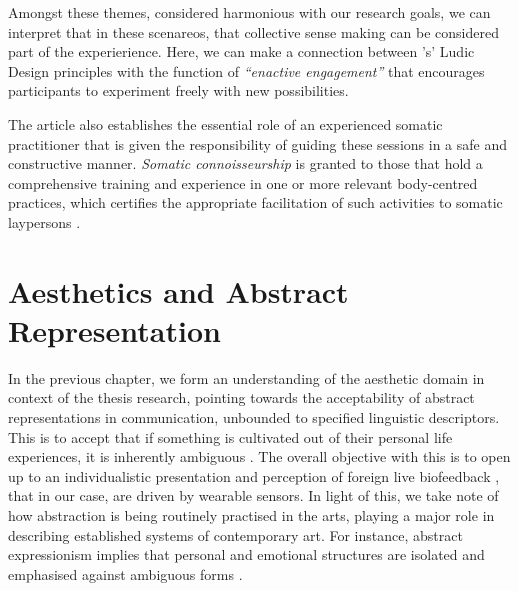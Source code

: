 Amongst these themes, considered harmonious with our research goals, we can interpret that in these scenareos, that collective sense making can be considered part of the experierience. Here, we can make a connection between \citeauthor{gaver_drift_2004}'s' Ludic Design principles \cite{gaver_drift_2004} with the function of \textit{``enactive engagement''} that encourages participants to experiment freely with new possibilities.

The article also establishes the essential role of an experienced somatic practitioner that is given the responsibility of guiding these sessions in a safe and constructive manner. \textit{Somatic connoisseurship} is granted to those that hold a comprehensive training and experience in one or more relevant body-centred practices, which certifies the appropriate facilitation of such activities to somatic laypersons \cite{samaritter_aesthetic_2018}.


\section{Aesthetics and Abstract Representation}
\label{lit_review:abstract}

In the previous chapter, we form an understanding of the aesthetic domain in context of the thesis research, pointing towards the acceptability of abstract representations in communication, unbounded to specified linguistic descriptors. This is to accept that if something is cultivated out of their personal life experiences, it is inherently ambiguous \cite{kaplan_esthetic_1948}. The overall objective with this is to open up to an individualistic presentation and perception of foreign live biofeedback \cite{lux_live_2018}, that in our case, are driven by wearable sensors. In light of this, we take note of how abstraction is being routinely practised in the arts, playing a major role in describing established systems of contemporary art. For instance, abstract expressionism implies that personal and emotional structures are isolated and emphasised against ambiguous forms \cite{pollock_action_2008}.

